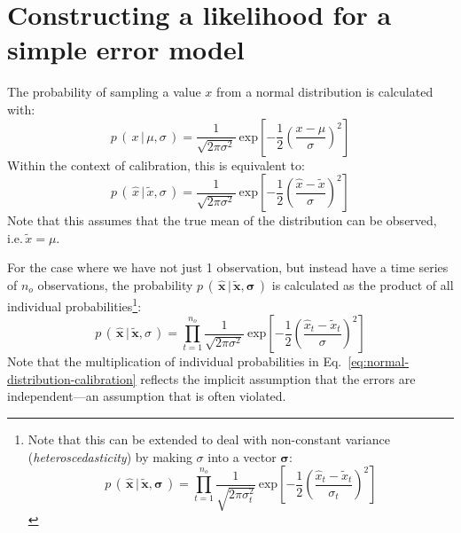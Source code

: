 






\section{Constructing a likelihood for a simple error model}
The probability of sampling a value $x$ from a normal distribution  is calculated with:
\begin{equation}\label{eq:normal-distribution}
p\,(\,x\,|\,\mu,\sigma\,) = \frac{1}{\sqrt{2\pi\sigma^2}}\:\mathrm{exp}\left[{-\frac{1}{2}\left(\frac{x-\mu}{\sigma}\right)^2}\right]
\end{equation}
Within the context of calibration, this is equivalent to:
\begin{equation}\label{eq:normal-distribution-calibration}
p\,(\,\hat{x}\,|\,\tilde{x},\sigma\,) = \frac{1}{\sqrt{2\pi\sigma^2}}\:\mathrm{exp}\left[{-\frac{1}{2}\left(\frac{\hat{x}-\tilde{x}}{\sigma}\right)^2}\right]
\end{equation}
Note that this assumes that the true mean of the distribution can be observed, i.e.\,$\tilde{x}=\mu$.

For the case where we have not just 1 observation, but instead have a time series of $n_o$ observations, the probability $p\,(\,\hat{\mathbf{x}}\,|\,\tilde{\mathbf{x}},\boldsymbol\sigma\,)$ is calculated as the product of all individual probabilities\footnote{Note that this can be extended to deal with non-constant variance (\textit{heteroscedasticity}) by making $\sigma$ into a vector $\boldsymbol\sigma$:
\begin{equation}\label{eq:heteroscedastic-normal-distribution-calibration}
p\,(\,\hat{\mathbf{x}}\,|\,\tilde{\mathbf{x}},\boldsymbol\sigma\,) = \prod_{t=1}^{n_o} \frac{1}{\sqrt{2\pi\sigma_t^2}}\:\mathrm{exp}\left[{-\frac{1}{2}\left(\frac{\hat{x}_t-\tilde{x}_t}{\sigma_t}\right)^2}\right]\nonumber
\end{equation}}:
\begin{equation}\label{eq:normal-distribution-calibration}
p\,(\,\hat{\mathbf{x}}\,|\,\tilde{\mathbf{x}},\sigma\,) = \prod_{t=1}^{n_o} \frac{1}{\sqrt{2\pi\sigma^2}}\:\mathrm{exp}\left[{-\frac{1}{2}\left(\frac{\hat{x}_t-\tilde{x}_t}{\sigma}\right)^2}\right]
\end{equation}
Note that the multiplication of individual probabilities in Eq.~\ref{eq:normal-distribution-calibration} reflects the implicit assumption that the errors are independent---an assumption that is often violated.

